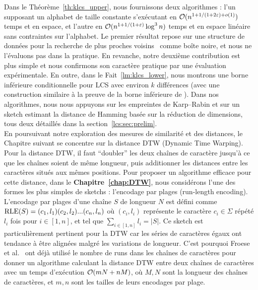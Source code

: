 Dans le Théorème~\ref{th:klcs_upper}, nous fournissons deux algorithmes : l'un supposant un alphabet de taille constante s'exécutant en $\mathcal{O}(n^{1+ 1/(1+2\varepsilon) + o(1)})$ temps et en espace, et l'autre en $\mathcal{O}(n^{1+1/(1+\varepsilon)} \log^3 n)$ temps et en espace linéaire sans contraintes sur l'alphabet. Le premier résultat repose sur une structure de données pour la recherche de plus proches voisins~\cite{DBLP:conf/stoc/AndoniR15} comme boîte noire, et nous ne l'évaluons pas dans la pratique. En revanche, notre deuxième contribution est plus simple et nous confirmons son caractère pratique par une évaluation expérimentale.
En outre, dans le Fait~\ref{lm:klcs_lower}, nous montrons une borne inférieure conditionnelle pour LCS avec environ $k$ différences (avec une construction similaire à la preuve de la borne inférieure de \kLCS ).
Dans nos algorithmes, nous nous appuyons sur les empreintes de Karp--Rabin et sur un sketch estimant la distance de Hamming basée sur la réduction de dimensions, tous deux détaillés dans la section~\ref{lcs:sec:prelim}. \\


En poursuivant notre exploration des mesures de similarité et des distances, le Chapitre suivant se concentre sur la distance DTW (Dynamic Time Warping). Pour la distance DTW, il faut ``doubler'' les deux chaînes de caractère jusqu'à ce que les chaînes soient de même longueur, puis additionner les distances entre les caractères situés aux mêmes positions.
Pour proposer un algorithme efficace pour cette distance, dans le \textbf{Chapitre~\ref{chap:DTW}}, nous considérons l'une des formes les plus simples de sketchs : l'encodage par plages (run-length encoding). L'encodage par plages d'une chaîne $S$ de longueur $N$ est défini comme $\mathrm{RLE}(S)=(c_1,l_1)(c_2,l_2)... (c_n,l_n)$ où $(c_i,l_i)$ représente le caractère $c_i \in \Sigma$ répété $l_i$ fois pour $i \in [1,n]$, et tel que $\sum_{i\in [1,n]} l_i = |S|$.
Ce sketch est particulièrement pertinent pour la DTW car les séries de caractères égaux ont tendance à être alignées malgré les variations de longueur. C'est pourquoi Froese et al.~\cite{DBLP:journals/corr/abs-1903-03003} ont déjà utilisé le nombre de runs dans les chaînes de caractères pour donner un algorithme calculant la distance DTW entre deux chaînes de caractères avec un temps d'exécution $\mathcal{O}(mN+nM)$, où $M,N$ sont la longueur des chaînes de caractères, et $m, n$ sont les tailles de leurs encodages par plage.

